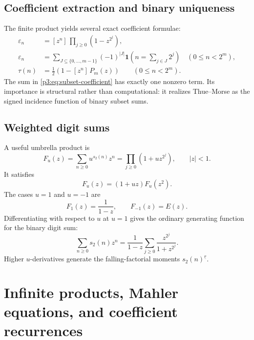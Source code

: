 \documentclass[11pt,oneside]{article}
\theoremstyle{definition}
\theoremstyle{remark}
\newcommand{\bitsum}{s_2}
\newcommand{\eps}{\varepsilon}
\newcommand{\ind}{\mathbf 1}
\newcommand{\coeff}[2]{[z^{#1}]\,#2}
\newcommand{\fall}[2]{#1^{\underline{#2}}}
\begin{document}
\subsection{Coefficient extraction and binary uniqueness}

The finite product yields several exact coefficient formulae:
\begin{align}
 \eps_n
 &=\coeff n{\prod_{j\ge0}(1-z^{2^j})},\label{p3:eq:coefficient-infinite-formal}\\
 \eps_n
 &=\sum_{J\subseteq\{0,\ldots,m-1\}}
    (-1)^{|J|}\ind\!\left(n=\sum_{j\in J}2^j\right)
    \quad(0\le n<2^m),\label{p3:eq:subset-coefficient}\\
 \tau(n)&=\frac12\left(1-\coeff n{P_m(z)}\right)
    \qquad(0\le n<2^m).
\end{align}
The sum in \cref{p3:eq:subset-coefficient} has exactly one nonzero term.  Its
importance is structural rather than computational: it realizes Thue--Morse as
the signed incidence function of binary subset sums.

\subsection{Weighted digit sums}

A useful umbrella product is
\begin{equation}\label{p3:eq:Fu}
 F_u(z)=\sum_{n\ge0}u^{\bitsum(n)}z^n
       =\prod_{j\ge0}(1+u z^{2^j}),
 \qquad |z|<1.
\end{equation}
It satisfies
\begin{equation}\label{p3:eq:Fu-mahler}
 F_u(z)=(1+uz)F_u(z^2).
\end{equation}
The cases $u=1$ and $u=-1$ are
\begin{equation}\label{p3:eq:Fu-special}
 F_1(z)=\frac1{1-z},
 \qquad
 F_{-1}(z)=E(z).
\end{equation}
Differentiating with respect to $u$ at $u=1$ gives the ordinary generating
function for the binary digit sum:
\begin{equation}\label{p3:eq:digit-sum-ogf}
 \sum_{n\ge0}\bitsum(n)z^n
 =\frac1{1-z}\sum_{j\ge0}\frac{z^{2^j}}{1+z^{2^j}}.
\end{equation}
Higher $u$-derivatives generate the falling-factorial moments
$\fall{\bitsum(n)}r$.

\section{Infinite products, Mahler equations, and coefficient recurrences}
\end{document}

